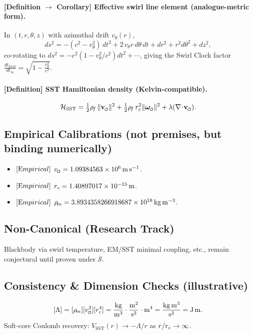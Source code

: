 \documentclass[11pt]{article}
\begin{document}
    \paragraph{[Definition \(\to\) Corollary] Effective swirl line element (analogue-metric form).}
    In \((t,r,\theta,z)\) with azimuthal drift \(v_\theta(r)\),
    \[
        ds^2=-(c^2-v_\theta^2)\,dt^2+2\,v_\theta r\,d\theta\,dt+dr^2+r^2d\theta^2+dz^2,
    \]
    co-rotating to \(ds^2=-c^2(1-v_\theta^2/c^2)dt^2+\cdots\), giving the Swirl Clock factor
    \(\displaystyle \frac{dt_{\text{local}}}{dt_\infty}=\sqrt{1-\frac{v_\theta^2}{c^2}}\).

    \paragraph{[Definition] SST Hamiltonian density (Kelvin-compatible).}
    \[
        \mathcal{H}_{\text{SST}}=\tfrac12\rhof\,\|\vswirl\|^2+\tfrac12\rhof\,\rc^2\|\omegas\|^2+\lambda(\nabla\!\cdot\!\vswirl).
    \]

    \subsection*{Empirical Calibrations (not premises, but binding numerically)}
    \begin{itemize}
        \item \([{\textrm Empirical}]\) \(\vscore = 1.09384563\times 10^6\,\mathrm{m\,s^{-1}}\).
        \item \([{\textrm Empirical}]\) \(r_c = 1.40897017\times 10^{-15}\,\mathrm{m}\).
        \item \([{\textrm Empirical}]\) \(\rho_{\!m} = 3.8934358266918687\times 10^{18}\,\mathrm{kg\,m^{-3}}\).
    \end{itemize}

    \subsection*{Non-Canonical (Research Track)}
    Blackbody via swirl temperature, EM/SST minimal coupling, etc., remain conjectural until proven under \(\mathcal{S}\).

    \subsection*{Consistency \& Dimension Checks (illustrative)}
    \[
        [\Lambda]=[\rhom][\vscore^2][\rc^4]
        =\frac{\mathrm{kg}}{\mathrm{m^3}}\cdot\frac{\mathrm{m^2}}{\mathrm{s^2}}\cdot\mathrm{m^4}
        =\frac{\mathrm{kg\,m^3}}{\mathrm{s^2}}
        =\mathrm{J\,m}.
    \]
    Soft-core Coulomb recovery: \(V_{\text{SST}}(r)\to -\Lambda/r\) as \(r/r_c\to\infty\).
\end{document}
